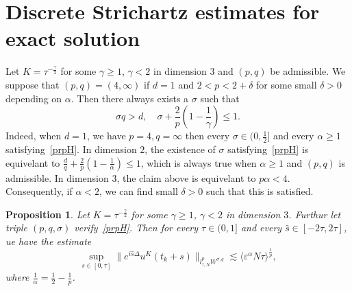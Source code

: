 \documentclass[10pt,a4paper]{article}
\newtheorem{proposition}[theorem]{Proposition}
\begin{document}
  \section{Discrete Strichartz estimates for exact solution}


  Let \(K=\tau^{-\frac\gamma2}\) for some \(\gamma\geq1\), \(\gamma<2\) in
  dimension \(3\) and \((p,q)\) be admissible. We suppose that \((p,q)=(4,\infty)\) if
  \(d=1\) and \(2<p<2+\delta\) for some small \(\delta>0\) depending on \(\alpha\).
  Then there always exists a \(\sigma\) such that 
  \begin{equation}\label{prpH}
    \sigma q > d, \quad \sigma + \frac2p \left( 1-\frac1\gamma \right) \leq 1.
  \end{equation}
  Indeed, when \(d=1\), we have \(p=4,q=\infty\) then every \(\sigma \in
  (0,\frac12] \) and every \(\alpha\geq1\) satisfying~\eqref{prpH}. In dimension
  \(2\), the existence of \(\sigma\) satisfying~\eqref{prpH} is equivelant to
  \( \frac dq +\frac2p (1-\frac1\alpha) \leq 1 \), which is always true when
  \(\alpha \geq 1\) and \((p,q)\) is admissible. In dimension \(3\), the claim
  above is equivelant to \(p\alpha < 4\). Consequently, if \(\alpha<2\), we can
  find small \(\delta>0\) such that this is satisfied.

  \begin{proposition}\label{uKlpLq}
    Let \(K = \tau^{-\frac\gamma2}\) for some \(\gamma\geq1\), \(\gamma<2\)
    in dimension \(3\). Furthur let triple \((p,q,\sigma)\) verify~\eqref{prpH}.
    Then for every \( \tau \in (0,1] \) and every \(\hat{s} \in 
    [-2\tau,2\tau] \), ue have the estimate
    \begin{equation}
      \sup_{s\in[0,\tau]} \|e^{i\hat{s}\Delta}u^K(t_k+s)\|_{l^p_{\tau,N} W^{\sigma,q}}
      \lesssim \langle\varepsilon^\alpha N\tau\rangle^\frac1p,
    \end{equation}
    where \(\frac1\alpha = \frac12 - \frac1p\).
  \end{proposition}
  
\end{document}
